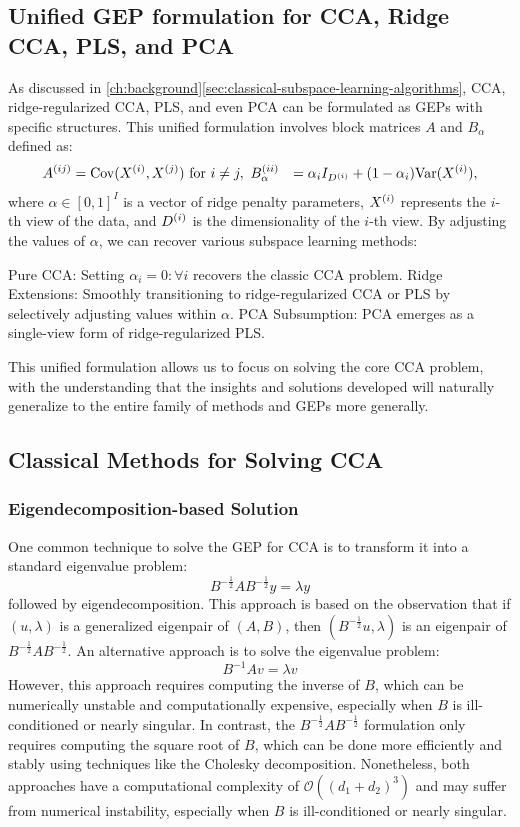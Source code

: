 \subsection{Unified GEP formulation for CCA, Ridge CCA, PLS, and PCA}
As discussed in \ref{ch:background}\ref{sec:classical-subspace-learning-algorithms}, CCA, ridge-regularized CCA, PLS, and even PCA can be formulated as GEPs with specific structures. This unified formulation involves block matrices $A$ and $B_\alpha$ defined as:
\begin{align}
A^{(ij)} &= \mathrm{Cov}(X^{(i)}, X^{(j)}) \text{ for } i \neq j, \
B_\alpha^{(ii)} &= \alpha_i I_{D^{(i)}} + (1-\alpha_i) \mathrm{Var}(X^{(i)}),
\end{align}
where $\alpha \in [0,1]^I$ is a vector of ridge penalty parameters, $X^{(i)}$ represents the $i$-th view of the data, and $D^{(i)}$ is the dimensionality of the $i$-th view.
By adjusting the values of $\alpha$, we can recover various subspace learning methods:

Pure CCA: Setting $\alpha_i = 0 : \forall i$ recovers the classic CCA problem.
Ridge Extensions: Smoothly transitioning to ridge-regularized CCA or PLS by selectively adjusting values within $\alpha$.
PCA Subsumption: PCA emerges as a single-view form of ridge-regularized PLS.

This unified formulation allows us to focus on solving the core CCA problem, with the understanding that the insights and solutions developed will naturally generalize to the entire family of methods and GEPs more generally.

\subsection{Classical Methods for Solving CCA}
\subsubsection{Eigendecomposition-based Solution}
One common technique to solve the GEP for CCA is to transform it into a standard eigenvalue problem:
\begin{equation}
B^{-\frac{1}{2}} A B^{-\frac{1}{2}} y = \lambda y
\end{equation}
followed by eigendecomposition. This approach is based on the observation that if $(u, \lambda)$ is a generalized eigenpair of $(A, B)$, then $(B^{-\frac{1}{2}}u, \lambda)$ is an eigenpair of $B^{-\frac{1}{2}} A B^{-\frac{1}{2}}$.
An alternative approach is to solve the eigenvalue problem:
\begin{equation}
B^{-1} A v = \lambda v
\end{equation}
However, this approach requires computing the inverse of $B$, which can be numerically unstable and computationally expensive, especially when $B$ is ill-conditioned or nearly singular. In contrast, the $B^{-\frac{1}{2}} A B^{-\frac{1}{2}}$ formulation only requires computing the square root of $B$, which can be done more efficiently and stably using techniques like the Cholesky decomposition.
Nonetheless, both approaches have a computational complexity of $\mathcal{O}((d_1+d_2)^3)$ and may suffer from numerical instability, especially when $B$ is ill-conditioned or nearly singular.

